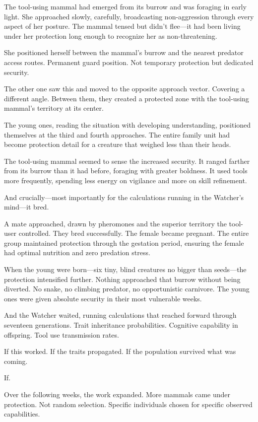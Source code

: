 The tool-using mammal had emerged from its burrow and was foraging in early light. She approached slowly, carefully, broadcasting non-aggression through every aspect of her posture. The mammal tensed but didn't flee—it had been living under her protection long enough to recognize her as non-threatening.

She positioned herself between the mammal's burrow and the nearest predator access routes. Permanent guard position. Not temporary protection but dedicated security.

The other one saw this and moved to the opposite approach vector. Covering a different angle. Between them, they created a protected zone with the tool-using mammal's territory at its center.

The young ones, reading the situation with developing understanding, positioned themselves at the third and fourth approaches. The entire family unit had become protection detail for a creature that weighed less than their heads.

The tool-using mammal seemed to sense the increased security. It ranged farther from its burrow than it had before, foraging with greater boldness. It used tools more frequently, spending less energy on vigilance and more on skill refinement.

And crucially—most importantly for the calculations running in the Watcher's mind—it bred.

A mate approached, drawn by pheromones and the superior territory the tool-user controlled. They bred successfully. The female became pregnant. The entire group maintained protection through the gestation period, ensuring the female had optimal nutrition and zero predation stress.

When the young were born—six tiny, blind creatures no bigger than seeds—the protection intensified further. Nothing approached that burrow without being diverted. No snake, no climbing predator, no opportunistic carnivore. The young ones were given absolute security in their most vulnerable weeks.

And the Watcher waited, running calculations that reached forward through seventeen generations. Trait inheritance probabilities. Cognitive capability in offspring. Tool use transmission rates.

If this worked. If the traits propagated. If the population survived what was coming.

If.

\scenebreak

Over the following weeks, the work expanded. More mammals came under protection. Not random selection. Specific individuals chosen for specific observed capabilities.

